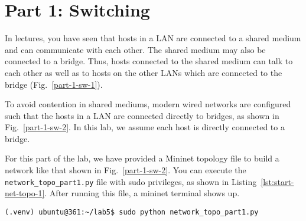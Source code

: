 \documentclass[11pt]{article}
\begin{document}


\section{Part 1: Switching}
\label{sec:exercise1}


In lectures, you have seen that hosts in a LAN are connected to a shared medium and can communicate with each other. The shared medium may also be connected to a bridge.
Thus, hosts connected to the shared medium can talk to each other as well as to hosts on the other LANs which are connected to the bridge (Fig.~\ref{part-1-sw-1}).


To avoid contention in shared mediums, modern wired networks are configured such that the hosts in a LAN are connected directly to bridges, as shown in Fig.~\ref{part-1-sw-2}.
In this lab, we assume each host is directly connected to a bridge.


For this part of the lab, we have provided a Mininet topology file to build a network like that shown in Fig.~\ref{part-1-sw-2}.
You can execute the \texttt{network\_topo\_part1.py} file with sudo privileges, as shown in Listing~\ref{lst:start-net-topo-1}. After running this file, a mininet terminal shows up.



\begin{lstlisting}[style=ece361shell, caption={Execute the the network topology file to create the virtual network}, label={lst:start-net-topo-1}]
(.venv) ubuntu@361:~/lab5$ sudo python network_topo_part1.py
\end{lstlisting}
\end{document}
